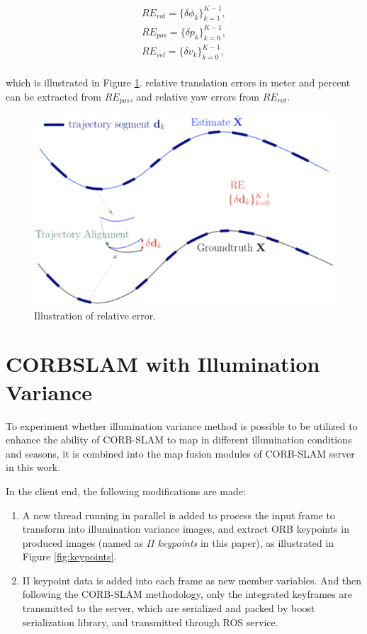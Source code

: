 \begin{inparaenum}[Step 1.]
	\begin{equation}
	\begin{array}{ll}
	RE_{rot}=\{\delta\phi_k\}_{k=1}^{K-1}, \\
	RE_{pos}=\{\delta p_k\}_{k=0}^{K-1}, \\
	RE_{vel}=\{\delta v_k\}_{k=0}^{K-1}, \\
	\end{array}
	\end{equation}
	
	which is illustrated in Figure \ref{fig:relerrcal}. relative translation errors in meter and percent can be extracted from $RE_{pos}$, and relative yaw errors from $RE_{rot}$.
	
	\begin{figure}[H]
		\centering
		\includegraphics[width=5in]{Chapter3/relerr.eps}
		\caption{Illustration of relative error.}
		\label{fig:relerrcal} 
	\end{figure}

\end{inparaenum}

\section{CORBSLAM with Illumination Variance}

To experiment whether illumination variance method is possible to be utilized to enhance the ability of CORB-SLAM to map in different illumination conditions and seasons, it is combined into the map fusion modules of CORB-SLAM server in this work. 

In the client end, the following modifications are made:

\begin{enumerate}
	\item A new thread running in parallel is added to process the input frame to transform into illumination variance images, and extract ORB keypoints in produced images (named as \textsl{II keypoints} in this paper), as illustrated in Figure \ref{fig:keypoints}.
	\item II keypoint data is added into each frame as new member variables. And then following the CORB-SLAM methodology, only the integrated keyframes are transmitted to the server,  which are serialized and packed by boost serialization library, and transmitted through ROS service.
\end{enumerate}

